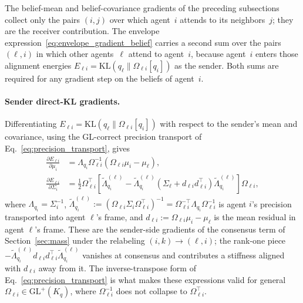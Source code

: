 \documentclass[11pt]{article}
\begin{document}
The belief-mean and belief-covariance gradients of the preceding subsections collect only the pairs $(i,j)$ over which agent~$i$ attends to its neighbors~$j$; they are the receiver contribution. The envelope expression~\eqref{eq:envelope_gradient_belief} carries a second sum over the pairs $(\ell, i)$ in which other agents~$\ell$ attend to agent~$i$, because agent~$i$ enters those alignment energies $E_{\ell i} = \mathrm{KL}(q_\ell \| \Omega_{\ell i}[q_i])$ as the sender. Both sums are required for any gradient step on the beliefs of agent~$i$.

\paragraph{Sender direct-KL gradients.}
Differentiating $E_{\ell i} = \mathrm{KL}(q_\ell \| \Omega_{\ell i}[q_i])$ with respect to the sender's mean and covariance, using the GL-correct precision transport of Eq.~\eqref{eq:precision_transport}, gives
\begin{align}
\frac{\partial E_{\ell i}}{\partial \mu_i} &= \Lambda_{q_i}\Omega_{\ell i}^{-1}\left(\Omega_{\ell i}\mu_i - \mu_\ell\right), \\
\frac{\partial E_{\ell i}}{\partial \Sigma_i} &= \frac{1}{2}\Omega_{\ell i}^{\top}\left[\tilde{\Lambda}_{q_i}^{(\ell)} - \tilde{\Lambda}_{q_i}^{(\ell)}\left(\Sigma_\ell + d_{\ell i}d_{\ell i}^{\top}\right)\tilde{\Lambda}_{q_i}^{(\ell)}\right]\Omega_{\ell i},
\end{align}
where $\Lambda_{q_i} = \Sigma_i^{-1}$, $\tilde{\Lambda}_{q_i}^{(\ell)} := (\Omega_{\ell i}\Sigma_i\Omega_{\ell i}^{\top})^{-1} = \Omega_{\ell i}^{-\top}\Lambda_{q_i}\Omega_{\ell i}^{-1}$ is agent $i$'s precision transported into agent $\ell$'s frame, and $d_{\ell i} := \Omega_{\ell i}\mu_i - \mu_\ell$ is the mean residual in agent $\ell$'s frame. These are the sender-side gradients of the consensus term of Section~\ref{sec:mass} under the relabeling $(i,k) \to (\ell, i)$; the rank-one piece $-\tilde{\Lambda}_{q_i}^{(\ell)}d_{\ell i}d_{\ell i}^{\top}\tilde{\Lambda}_{q_i}^{(\ell)}$ vanishes at consensus and contributes a stiffness aligned with $d_{\ell i}$ away from it. The inverse-transpose form of Eq.~\eqref{eq:precision_transport} is what makes these expressions valid for general $\Omega_{\ell i} \in \mathrm{GL}^{+}(K_q)$, where $\Omega_{\ell i}^{-1}$ does not collapse to $\Omega_{\ell i}^{\top}$.
\end{document}
